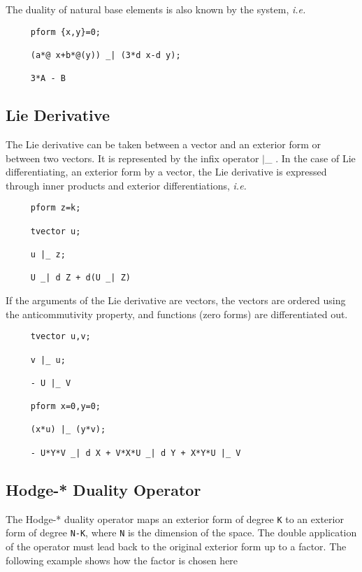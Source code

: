 The duality of natural base elements is also known by the system, {\em i.e.}

\begin{verbatim}
     pform {x,y}=0;

     (a*@ x+b*@(y)) _| (3*d x-d y);

     3*A - B
\end{verbatim}

\subsection{Lie Derivative}

The Lie derivative can be taken between a vector and an exterior form
or between two vectors.  It is represented by the infix operator $|$\_
\label{lie}.  In the case of Lie differentiating, an exterior form by
a vector, the Lie derivative is expressed through inner products and
exterior differentiations, \emph{i.e.} 

\begin{verbatim}
     pform z=k;

     tvector u;

     u |_ z;

     U _| d Z + d(U _| Z)
\end{verbatim}

If the arguments of the Lie derivative are vectors, the vectors are
ordered using the anticommutivity property, and functions (zero forms)
are differentiated out.

\example{}

\begin{verbatim}
     tvector u,v;

     v |_ u;

     - U |_ V 

     pform x=0,y=0;

     (x*u) |_ (y*v);

     - U*Y*V _| d X + V*X*U _| d Y + X*Y*U |_ V
\end{verbatim}

\subsection{Hodge-* Duality Operator}

 
The Hodge-*\label{hodge} duality operator maps an exterior form of degree
\texttt{K} to an exterior form of degree \texttt{N-K}, where \texttt{N} is the
dimension of the space.  The double application of the operator must
lead back to the original exterior form up to a factor. The following
example shows how the factor is chosen here

